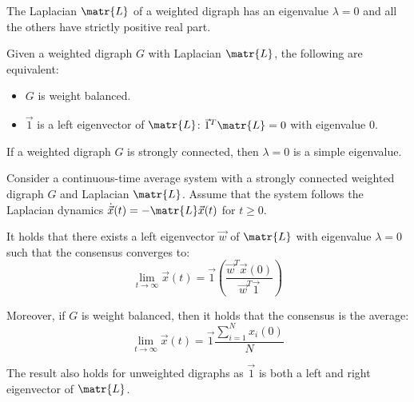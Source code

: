 \begin{lemma} \label{th:weighted_laplacian_eigenvalues}
    The Laplacian $\matr{L}$ of a weighted digraph has an eigenvalue $\lambda=0$ and all the others have strictly positive real part.
\end{lemma}

\begin{lemma}
    Given a weighted digraph $G$ with Laplacian $\matr{L}$, the following are equivalent:
    \begin{itemize}
        \item $G$ is weight balanced.
        \item $\vec{1}$ is a left eigenvector of $\matr{L}$: $\vec{1}^T\matr{L} = 0$ with eigenvalue $0$.
    \end{itemize}
\end{lemma}

\begin{lemma} \label{th:connected_simple_eigenvalue}
    If a weighted digraph $G$ is strongly connected, then $\lambda = 0$ is a simple eigenvalue.
\end{lemma}

\begin{theorem} 
    Consider a continuous-time average system with a strongly connected weighted digraph $G$ and Laplacian $\matr{L}$. Assume that the system follows the Laplacian dynamics $\dot{\vec{x}}(t) = - \matr{L}\vec{x}(t)$ for $t \geq 0$. 
    
    It holds that there exists a left eigenvector $\vec{w}$ of $\matr{L}$ with eigenvalue $\lambda=0$ such that the consensus converges to:
    \[
        \lim_{t \rightarrow \infty} \vec{x}(t) = \vec{1} \left( \frac{\vec{w}^T \vec{x}(0)}{\vec{w}^T \vec{1}} \right)
    \]

    Moreover, if $G$ is weight balanced, then it holds that the consensus is the average:
    \[
        \lim_{t \rightarrow \infty} \vec{x}(t) = \vec{1} \frac{\sum_{i=1}^N x_i(0)}{N}
    \]

        
\end{theorem}

\begin{remark}
    The result also holds for unweighted digraphs as $\vec{1}$ is both a left and right eigenvector of $\matr{L}$.
\end{remark}